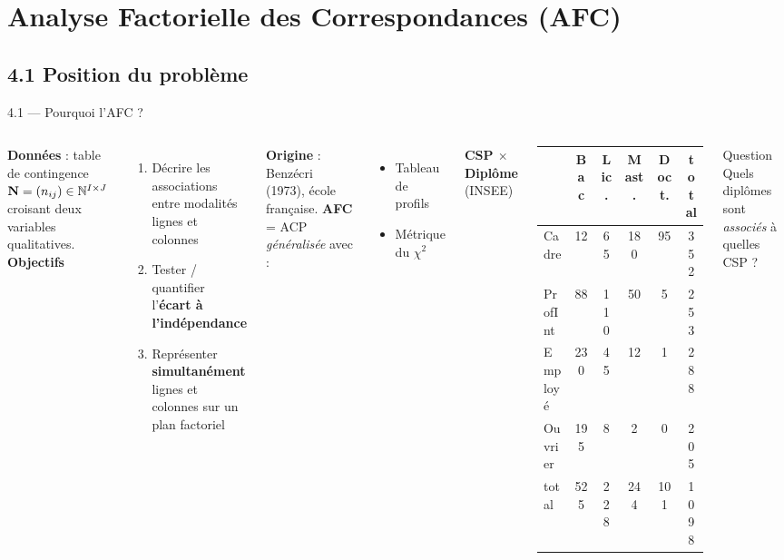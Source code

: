 \section{Analyse Factorielle des Correspondances (AFC)}

\subsection{4.1 Position du problème}
\begin{frame}{4.1 — Pourquoi l'AFC ?}
\begin{columns}[T]
\textbf{Données} : table de contingence $\mathbf{N} = (n_{ij}) \in \mathbb{N}^{I \times J}$
croisant deux variables \alert{qualitatives}.\\[0.1cm]

\textbf{Objectifs}
\begin{enumerate}
  \item Décrire les associations entre modalités lignes et colonnes
  \item Tester / quantifier l'\textbf{écart à l'indépendance}
  \item Représenter \textbf{simultanément} lignes et colonnes
        sur un plan factoriel
\end{enumerate}

\vspace{0.2cm}
\textbf{Origine} : Benzécri (1973), école française.
\textbf{AFC} = ACP \emph{généralisée} avec :
\begin{itemize}\small
  \item Tableau de profils
  \item Métrique du $\chi^2$
\end{itemize}
\centering
\footnotesize
\textbf{CSP $\times$ Diplôme} (INSEE)
\renewcommand{\arraystretch}{1.05}
\begin{tabular}{l|cccc|c}
\toprule
 & Bac & Lic. & Mast. & Doct. & total \\
\midrule
Cadre   & 12 & 65 & 180 & 95 & 352 \\
ProfInt & 88 & 110 & 50  & 5  & 253 \\
Employé & 230& 45 & 12  & 1  & 288 \\
Ouvrier & 195& 8  & 2   & 0  & 205 \\
\midrule
total   & 525& 228& 244 & 101& 1098\\
\bottomrule
\end{tabular}

\vspace{0.4cm}
\begin{block}{\small Question}
\small Quels diplômes sont \emph{associés} à quelles CSP ?
\end{block}
\end{columns}
\end{frame}

